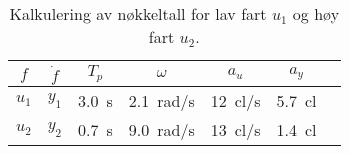 \documentclass[../main.tex]{subfiles}
\begin{document}
\begin{table}[H]
    \centering
    \begin{tabular}{@{}rrrrrrr@{}}
        \toprule
        \multicolumn{1}{c}{$f$} & \multicolumn{1}{c}{$\dot{f}$} & \multicolumn{1}{c}{$T_p$} & \multicolumn{1}{c}{$\omega$} & \multicolumn{1}{c}{$a_u$} & \multicolumn{1}{c}{$a_y$} & \\ \midrule
        $u_1$                   & $y_1$                         & \SI{3.0}{s}               & \SI{2.1}{rad/s}              & \SI{12}{cl/s}             & \SI{5.7}{cl}                \\
        $u_2$                   & $y_2$                         & \SI{0.7}{s}               & \SI{9.0}{rad/s}              & \SI{13}{cl/s}             & \SI{1.4}{cl}                \\ \bottomrule
    \end{tabular}
    \caption{Kalkulering av nøkkeltall for lav fart $u_1$ og høy fart $u_2$.}
    \label{tab:kap1_sinus}
\end{table}
\end{document}

